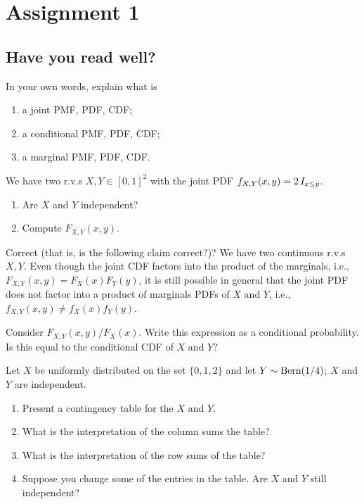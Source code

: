 \documentclass[assignments]{subfiles}
\begin{document}
\section{Assignment 1}
\label{sec:org9cbca82}


\subsection{Have you read well?}
\label{sec:have-you-read}


\begin{exercise}
In your own words, explain what is
\begin{enumerate}
\item a joint PMF, PDF, CDF;
\item a conditional PMF, PDF, CDF;
\item a marginal PMF, PDF, CDF.
\end{enumerate}
\end{exercise}

\begin{exercise}
We have two r.v.s $X, Y \in [0,1]^{2}$ with the joint PDF $f_{X,Y}(x,y) = 2 \,I_{x\leq y}$.
\begin{enumerate}
\item Are $X$ and $Y$ independent?
\item Compute $F_{X,Y}(x,y)$.
\end{enumerate}
\end{exercise}

\begin{exercise}
Correct (that is, is the following claim correct?)?
We have two continuous r.v.s $X, Y$.
Even though the joint CDF factors into the product of the marginals, i.e., $F_{X,Y}(x,y) = F_X(x)F_Y(y)$, it is still possible in general that the joint PDF does not factor into a product of marginals PDFs of $X$ and $Y$, i.e., $f_{X,Y}(x,y) \neq f_X(x) f_Y(y)$.
\end{exercise}

\begin{exercise}
Consider $F_{X,Y}(x,y)/F_{X}(x)$. Write this expression as a conditional probability. Is this equal to the conditional CDF of $X$ and $Y$?
\end{exercise}

\begin{exercise}
Let $X$ be uniformly distributed on the set $\{0,1,2\}$ and let $Y \sim \mathrm{Bern}(1/4)$; $X$ and $Y$ are independent.
\begin{enumerate}
\item Present a contingency table for the $X$ and $Y$.
\item What is the interpretation of the column sums the table?
\item What is the interpretation of the row sums of the table?
\item Suppose you change some of the entries in the table. Are $X$ and $Y$ still independent?
\end{enumerate}
\end{exercise}
\end{document}
